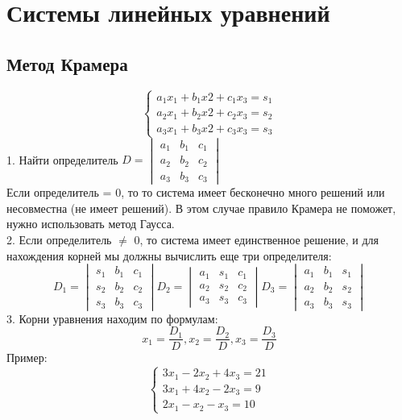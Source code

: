 \documentclass[12pt,a4paper]{article}
\begin{document}
\section{Системы линейных уравнений}
\subsection{Метод Крамера}
\begin{equation*}
 \begin{cases}
   a_{1}x_{1}+b_{1}x{2}+c_{1}x_{3}=s_{1}
   \\
   a_{2}x_{1}+b_{2}x{2}+c_{2}x_{3}=s_{2}
   \\
   a_{3}x_{1}+b_{3}x{2}+c_{3}x_{3}=s_{3}
 \end{cases}
\end{equation*}
1. Найти определитель $D = \begin{vmatrix}
a_{1}& b_{1}& c_{1} \\
a_{2}& b_{2}& c_{2} \\
a_{3}& b_{3}& c_{3}
\end{vmatrix}$ \\
Если определитель = 0, то то система имеет бесконечно много решений или несовместна (не имеет решений). В этом случае правило Крамера не поможет, нужно использовать метод Гаусса. \\
2. Если определитель $\neq$ 0, то система имеет единственное решение, и для нахождения корней мы должны вычислить еще три определителя:
$$D_{1} =
\begin{vmatrix}
s_{1}& b_{1}& c_{1} \\
s_{2}& b_{2}& c_{2} \\
s_{3}& b_{3}& c_{3}
\end{vmatrix} 
D_{2} =
\begin{vmatrix}
a_{1}& s_{1}& c_{1} \\
a_{2}& s_{2}& c_{2} \\
a_{3}& s_{3}& c_{3}
\end{vmatrix}
D_{3} =
\begin{vmatrix}
a_{1}& b_{1}& s_{1} \\
a_{2}& b_{2}& s_{2} \\
a_{3}& b_{3}& s_{3}
\end{vmatrix}$$
3. Корни уравнения находим по формулам:
$$x_{1} = \frac{D_{1}}{D}, x_{2} = \frac{D_{2}}{D}, x_{3} = \frac{D_{3}}{D}$$
Пример: \begin{equation*}
 \begin{cases}
   3x_{1}-2x_{2}+4x_{3}=21
   \\
   3x_{1}+4x_{2}-2x_{3}=9
   \\
   2x_{1}-x_{2}-x_{3}=10
 \end{cases}
\end{equation*}
\end{document}
